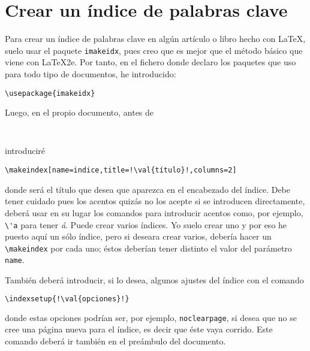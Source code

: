 \section{Crear un índice de palabras clave}\label{sec:tex-indice}
Para crear un índice de palabras clave en algún artículo o libro hecho con \LaTeX{}, suelo usar el paquete
\lstinline+imakeidx+, pues creo que es mejor que el método básico que viene con \LaTeX{}2e. Por tanto, en el
fichero  donde declaro los paquetes que uso para todo tipo de documentos, he introducido:

\begin{lstlisting}[gobble=2,style=bashinteract,escapechar=!]
  \usepackage{imakeidx}
\end{lstlisting}

\noindent Luego, en el propio documento, antes de

\begin{lstlisting}[gobble=2,style=bashinteract,escapechar=!]
  
\end{lstlisting}

\noindent introduciré

\begin{lstlisting}[gobble=2,style=bashinteract,escapechar=!]
  \makeindex[name=indice,title=!\val{título}!,columns=2]
\end{lstlisting}

\noindent donde  será el título que desea que aparezca en el encabezado del índice. Debe tener
cuidado pues los acentos quizás no los acepte si se introducen directamente, deberá usar en su lugar los
comandos para introducir acentos como, por ejemplo, \lstinline+\'a+ para tener \emph{á}. Puede crear varios
índices.  Yo suelo crear uno y por eso he puesto aquí un sólo índice, pero si deseara crear varios, debería
hacer un \lstinline+\makeindex+ por cada uno; éstos deberían tener distinto el valor del parámetro
\lstinline+name+.

También deberá introducir, si lo desea, algunos ajustes del índice con el comando

\begin{lstlisting}[gobble=2,language=bash,style=bashinteract,escapechar=!]
  \indexsetup{!\val{opciones}!}
\end{lstlisting}

\noindent donde estas opciones podrían ser, por ejemplo, \lstinline+noclearpage+, si desea que no se cree una
página nueva para el índice, es decir que éste vaya corrido. Este comando deberá ir también en el preámbulo del
documento.
